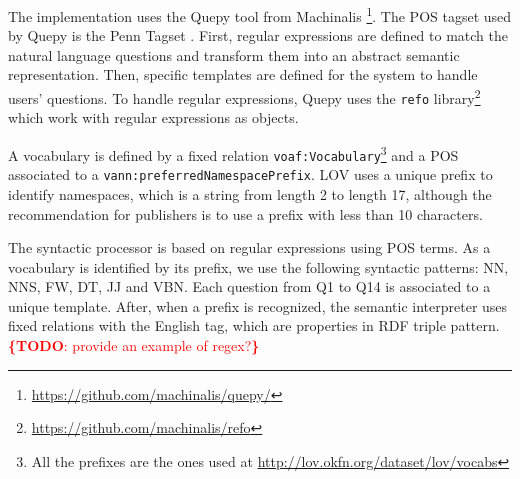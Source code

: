 \documentclass[runningheads,a4paper]{llncs}
\newcommand{\todo}[1]{\noindent\textcolor{red}{{\bf \{TODO}: #1{\bf \}}}}
\begin{document}
The implementation uses the Quepy tool from Machinalis \footnote{\url{https://github.com/machinalis/quepy/}}. The POS tagset used by Quepy is the Penn Tagset \cite{marcus1993building}. First, regular expressions are defined to match the natural language questions and transform them into an abstract semantic representation. Then, specific templates are defined for the system to handle users' questions. To handle regular expressions, Quepy uses the \texttt{refo} library\footnote{\url{https://github.com/machinalis/refo}} which work with regular expressions as objects. 

A vocabulary is defined by a fixed relation \texttt{voaf:Vocabulary}\footnote{All the prefixes are the ones used at \url{http://lov.okfn.org/dataset/lov/vocabs}} and a POS associated to a \texttt{vann:preferredNamespacePrefix}. LOV uses a unique prefix to identify namespaces, which is a string from length 2 to length 17, although the recommendation for publishers is to use a prefix with less than 10 characters.

The syntactic processor is based on regular expressions using POS terms. As a vocabulary is identified by its prefix, we use  the following syntactic patterns: NN, NNS, FW, DT, JJ and VBN. Each question from Q1 to Q14 is associated to a unique template. After, when a prefix is recognized, the semantic interpreter uses fixed relations with the English tag, which are properties in RDF triple pattern. \todo{provide an example of regex?}
\end{document}
